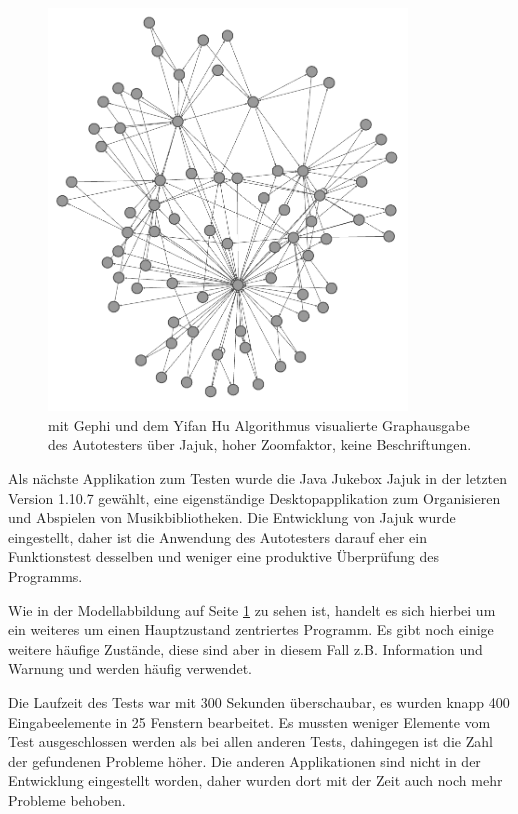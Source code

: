 \begin{figure}
	\centering
	\includegraphics[width=0.85\textwidth]{bilder/model_jajuk_notext.png}
	\caption{mit Gephi und dem Yifan Hu Algorithmus\cite{hu2005efficient}
    visualierte Graphausgabe des Autotesters über Jajuk, hoher Zoomfaktor, keine Beschriftungen.}
	\label{jajukmodel}
\end{figure}


Als nächste Applikation zum Testen wurde die Java Jukebox \glqq{}Jajuk\grqq{}
in der letzten Version 1.10.7 gewählt,
eine eigenständige Desktopapplikation zum Organisieren
und Abspielen von Musikbibliotheken. Die Entwicklung von
Jajuk wurde eingestellt, daher ist die Anwendung des
Autotesters darauf eher ein Funktionstest desselben
und weniger eine produktive Überprüfung des Programms.

Wie in der Modellabbildung auf Seite \ref{jajukmodel} zu sehen ist, handelt es sich hierbei
um ein weiteres um einen Hauptzustand zentriertes Programm. Es gibt noch
einige weitere häufige Zustände, diese sind aber in diesem Fall z.B.
\glqq{}Information\grqq{}  und \glqq{}Warnung\grqq{} und
werden häufig verwendet.

Die Laufzeit des Tests war mit 300 Sekunden überschaubar,
es wurden knapp 400 Eingabeelemente in 25 Fenstern bearbeitet.
Es mussten weniger Elemente vom Test ausgeschlossen werden
als bei allen anderen Tests, dahingegen ist die Zahl der gefundenen
Probleme höher. Die anderen Applikationen sind nicht
in der Entwicklung eingestellt worden, daher wurden
dort mit der Zeit auch noch mehr Probleme behoben.



